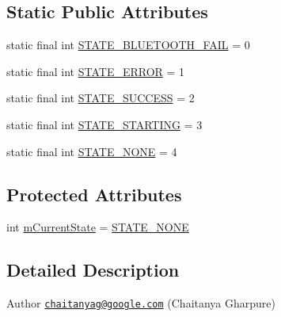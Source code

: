 \subsection*{Static Public Attributes}
\begin{DoxyCompactItemize}
\item 
static final int \hyperlink{classcom_1_1cellbots_1_1local_1_1robotcontrollerservice_1_1_abstract_robot_controller_service_aa0187a31d3fb28dc643d74a7ac1538fa}{S\-T\-A\-T\-E\-\_\-\-B\-L\-U\-E\-T\-O\-O\-T\-H\-\_\-\-F\-A\-I\-L} = 0
\item 
static final int \hyperlink{classcom_1_1cellbots_1_1local_1_1robotcontrollerservice_1_1_abstract_robot_controller_service_aba53d6310e83c1555db059c88b60902f}{S\-T\-A\-T\-E\-\_\-\-E\-R\-R\-O\-R} = 1
\item 
static final int \hyperlink{classcom_1_1cellbots_1_1local_1_1robotcontrollerservice_1_1_abstract_robot_controller_service_a7bbbb61660283628af88722d9777b8ef}{S\-T\-A\-T\-E\-\_\-\-S\-U\-C\-C\-E\-S\-S} = 2
\item 
static final int \hyperlink{classcom_1_1cellbots_1_1local_1_1robotcontrollerservice_1_1_abstract_robot_controller_service_a078271b018de36210ff01043219307a7}{S\-T\-A\-T\-E\-\_\-\-S\-T\-A\-R\-T\-I\-N\-G} = 3
\item 
static final int \hyperlink{classcom_1_1cellbots_1_1local_1_1robotcontrollerservice_1_1_abstract_robot_controller_service_a65af922f93f7618b1f4e3a2857e01188}{S\-T\-A\-T\-E\-\_\-\-N\-O\-N\-E} = 4
\end{DoxyCompactItemize}
\subsection*{Protected Attributes}
\begin{DoxyCompactItemize}
\item 
int \hyperlink{classcom_1_1cellbots_1_1local_1_1robotcontrollerservice_1_1_abstract_robot_controller_service_ab6ac659d3c91d6e8e9133e4a8da0c943}{m\-Current\-State} = \hyperlink{classcom_1_1cellbots_1_1local_1_1robotcontrollerservice_1_1_abstract_robot_controller_service_a65af922f93f7618b1f4e3a2857e01188}{S\-T\-A\-T\-E\-\_\-\-N\-O\-N\-E}
\end{DoxyCompactItemize}


\subsection{Detailed Description}
\begin{DoxyAuthor}{Author}
\href{mailto:chaitanyag@google.com}{\tt chaitanyag@google.\-com} (Chaitanya Gharpure) 
\end{DoxyAuthor}



